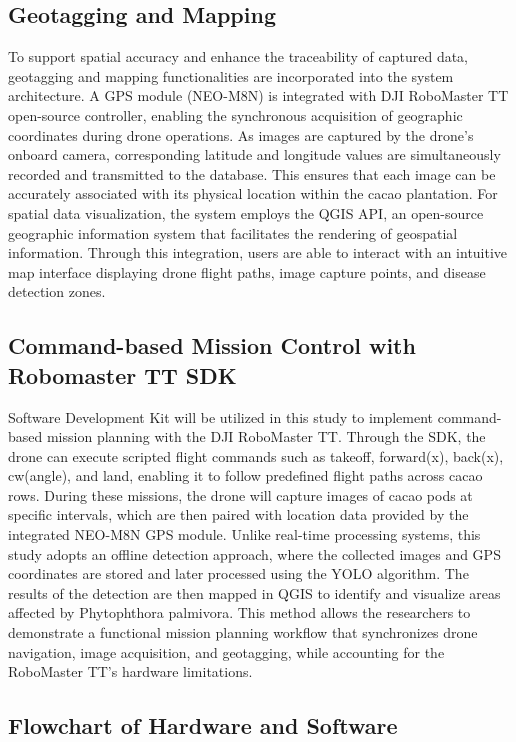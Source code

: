 	\subsection{Geotagging and Mapping}
	To support spatial accuracy and enhance the traceability of captured data, geotagging and mapping functionalities are incorporated into the system architecture. A GPS module (NEO-M8N) is integrated with DJI RoboMaster TT open-source controller, enabling the synchronous acquisition of geographic coordinates during drone operations. As images are captured by the drone’s onboard camera, corresponding latitude and longitude values are simultaneously recorded and transmitted to the database. This ensures that each image can be accurately associated with its physical location within the cacao plantation. For spatial data visualization, the system employs the QGIS API, an open-source geographic information system that facilitates the rendering of geospatial information. Through this integration, users are able to interact with an intuitive map interface displaying drone flight paths, image capture points, and disease detection zones.
	
	\subsection{Command-based Mission Control with Robomaster TT SDK}
	Software Development Kit will be utilized in this study to implement command-based mission planning with the DJI RoboMaster TT. Through the SDK, the drone can execute scripted flight commands such as takeoff, forward(x), back(x), cw(angle), and land, enabling it to follow predefined flight paths across cacao rows. During these missions, the drone will capture images of cacao pods at specific intervals, which are then paired with location data provided by the integrated NEO-M8N GPS module. Unlike real-time processing systems, this study adopts an offline detection approach, where the collected images and GPS coordinates are stored and later processed using the YOLO algorithm. The results of the detection are then mapped in QGIS to identify and visualize areas affected by Phytophthora palmivora. This method allows the researchers to demonstrate a functional mission planning workflow that synchronizes drone navigation, image acquisition, and geotagging, while accounting for the RoboMaster TT’s hardware limitations.
	
	\subsection{Flowchart of Hardware and Software}
	
